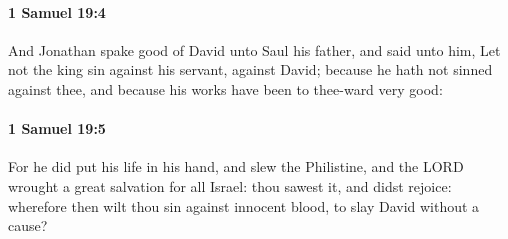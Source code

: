 		\paragraph{1 Samuel 19:4} %
			\label{1SAMUEL-19-4}

			And Jonathan spake good of David unto Saul his father, and said unto him, Let not the king sin against his servant, against David; because he hath not sinned against thee, and because his works have been to thee-ward very good:


		\paragraph{1 Samuel 19:5} %
			\label{1SAMUEL-19-5}

			For he did put his life in his hand, and slew the Philistine, and the LORD wrought a great salvation for all Israel: thou sawest it, and didst rejoice: wherefore then wilt thou sin against innocent blood, to slay David without a cause?

